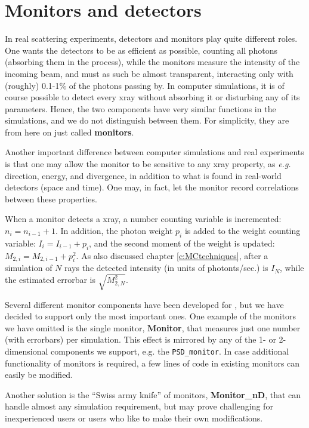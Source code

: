 \chapter{Monitors and detectors}

In real scattering experiments, detectors and monitors play quite
different roles. One wants the detectors to be as efficient as
possible, counting all photons (absorbing them in the process),
while the monitors measure the intensity of the incoming beam, and must
as such be almost transparent, interacting only with (roughly) 0.1-1\%
of the photons passing by. In computer simulations, it is
of course possible to detect every xray without
absorbing it or disturbing any of its parameters. Hence, the two components
have very similar functions in the simulations, and we do
not distinguish between them. For simplicity, they are from here on
just called \textbf{monitors}.

Another important difference between computer simulations
and real experiments is
that one may allow the monitor to be sensitive to any xray property,
as {\em e.g.} direction, energy, and divergence, in addition to what
is found in real-world detectors (space and time). One may, in
fact, let the monitor    record correlations between these properties.

When a monitor detects a xray,
a number counting variable is incremented: $n_i = n_{i-1}+1$.
In addition, the photon
weight $p_i$ is added to the weight counting variable:
$I_i = I_{i-1} + p_i$,
and the second moment of the weight is
updated: $M_{2,i} = M_{2,i-1} + p_i^2$.
As also discussed chapter \ref{c:MCtechniques}, after a simulation of $N$ rays
the detected intensity (in units of photonts/sec.) is $I_N$,
while the estimated errorbar is $\sqrt{M_{2,N}^2}$.

Several different monitor components have been developed for
\MCX , but we have decided to support only the most important ones.
One example of the monitors we have omitted is the single monitor,
\textbf{Monitor},
that measures just one number (with errorbars) per simulation.
This effect is mirrored by any of the 1- or 2-dimensional components
we support, e.g. the \texttt{PSD\_monitor}.
In case additional functionality of monitors is required,
a few lines of code in existing monitors can easily be modified.

Another solution is the ``Swiss army knife'' of monitors, \textbf{Monitor\_nD}, that can handle
almost any simulation requirement, but may prove challenging for inexperienced users or users who like to make their own modifications.

\newpage















\newpage


